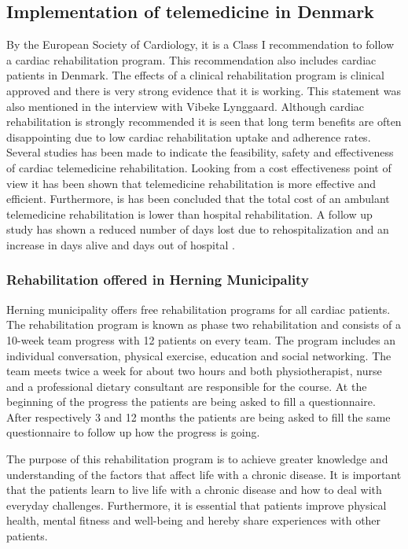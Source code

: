 \subsection{Implementation of telemedicine in Denmark}
By the European Society of Cardiology, it is a Class I recommendation to follow a cardiac rehabilitation program. This recommendation also includes cardiac patients in Denmark. The effects of a clinical rehabilitation program is clinical approved and there is very strong evidence that it is working. This statement was also mentioned in the interview with Vibeke Lynggaard. Although cardiac rehabilitation is strongly recommended it is seen that long term benefits are often disappointing due to low cardiac rehabilitation uptake and adherence rates.  Several studies has been made to indicate the feasibility, safety and effectiveness of cardiac telemedicine rehabilitation. Looking from a cost effectiveness point of view it has been shown that telemedicine rehabilitation is more effective and efficient. Furthermore, is has been concluded that the total cost of an ambulant telemedicine rehabilitation is lower than hospital rehabilitation. A follow up study has shown a reduced number of days lost due to rehospitalization and an increase in days alive and days out of hospital \cite{costeffect}. 

\subsubsection{Rehabilitation offered in Herning Municipality} 

Herning municipality offers free rehabilitation programs for all cardiac patients. The rehabilitation program is known as phase two rehabilitation and consists of a 10-week team progress with 12 patients on every team. The program includes an individual conversation, physical exercise, education and social networking. The team meets twice a week for about two hours and both physiotherapist, nurse and a professional dietary consultant are responsible for the course. At the beginning of the progress the patients are being asked to fill a questionnaire. After respectively 3 and 12 months the patients are being asked to fill the same questionnaire to follow up how the progress is going. 

The purpose of this rehabilitation program is to achieve greater knowledge and understanding of the factors that affect life with a chronic disease. It is important that the patients learn to live life with a chronic disease and how to deal with everyday challenges. Furthermore, it is essential that patients improve physical health, mental fitness and well-being and hereby share experiences with other patients. 

